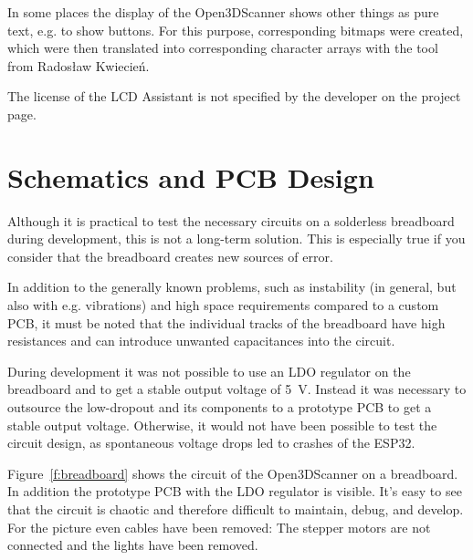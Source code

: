 In some places the display of the Open3DScanner shows other things as pure text, e.g. to show buttons. For this purpose, corresponding bitmaps were created, which were then translated into corresponding character arrays with the tool  from Radosław Kwiecień.%

The license of the LCD Assistant is not specified by the developer on the project page.%

\section{Schematics and PCB Design}%
Although it is practical to test the necessary circuits on a solderless breadboard during development, this is not a long-term solution. This is especially true if you consider that the breadboard creates new sources of error.%

In addition to the generally known problems, such as instability (in general, but also with e.g. vibrations) and high space requirements compared to a custom PCB, it must be noted that the individual tracks of the breadboard have high resistances and can introduce unwanted capacitances into the circuit.%

During development it was not possible to use an LDO regulator on the breadboard and to get a stable output voltage of \SI{5}{\volt}. Instead it was necessary to outsource the low-dropout and its components to a prototype PCB to get a stable output voltage. Otherwise, it would not have been possible to test the circuit design, as spontaneous voltage drops led to crashes of the ESP32.%

Figure~\ref{f:breadboard} shows the circuit of the Open3DScanner on a breadboard. In addition the prototype PCB with the LDO regulator is visible. It's easy to see that the circuit is chaotic and therefore difficult to maintain, debug, and develop. For the picture even cables have been removed: The stepper motors are not connected and the lights have been removed.%

